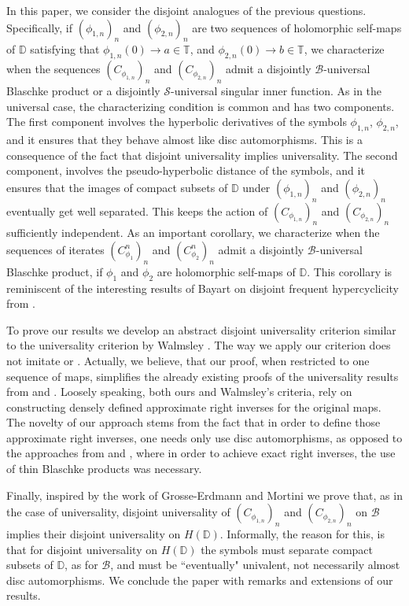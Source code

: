 \documentclass[12pt,a4paper]{amsart}
\theoremstyle{plain}
\theoremstyle{definition}
\theoremstyle{remark}
\theoremstyle{fact}
\begin{document}
In this paper, we consider the disjoint analogues of the previous questions. Specifically, if $(\phi_{1,n})_n$ and $(\phi_{2,n})_n$ are two sequences of holomorphic self-maps of $\mathbb{D}$ satisfying that $\phi_{1,n}(0)\rightarrow a\in \mathbb{T}$, and $\phi_{2,n}(0)\rightarrow b\in \mathbb{T}$, we characterize when the sequences $(C_{\phi_{1,n}})_n$ and $(C_{\phi_{2,n}})_n$ admit a disjointly $\mathcal{B}$-universal Blaschke product or a disjointly $\mathcal{S}$-universal singular inner function. As in the universal case, the characterizing condition is common and has two components. The first component involves the hyperbolic derivatives of the symbols $\phi_{1,n}$, $\phi_{2,n}$, and it ensures that they behave almost like disc automorphisms. This is a consequence of the fact that disjoint universality implies universality. The second component, involves the pseudo-hyperbolic distance of the symbols, and it ensures that the images of compact subsets of $\mathbb{D}$ under $(\phi_{1,n})_n$ and $(\phi_{2,n})_n$ eventually get well separated. This keeps the action of $(C_{\phi_{1,n}})_n$ and $(C_{\phi_{2,n}})_n$ sufficiently independent. As an important corollary, we characterize when the sequences of iterates $(C_{\phi_1}^n)_n$ and $(C_{\phi_2}^n)_n$ admit a disjointly $\mathcal{B}$-universal Blaschke product, if $\phi_1$ and $\phi_2$ are holomorphic self-maps of $\mathbb{D}$. This corollary is reminiscent of the interesting results of Bayart on disjoint frequent hypercyclicity from \cite{ba}.

To prove our results we develop an abstract disjoint universality criterion similar to the universality criterion by Walmsley \cite{Dave}. The way we apply our criterion does not imitate \cite{BGGM09} or \cite{Dave}. Actually, we believe, that our proof, when restricted to one sequence of maps, simplifies the already existing proofs of the universality results from \cite{BGGM09} and \cite{Dave}. Loosely speaking, both ours and Walmsley's criteria, rely on constructing densely defined approximate right inverses for the original maps. The novelty of our approach stems from the fact that in order to define those approximate right inverses, one needs only use disc automorphisms, as opposed to the approaches from \cite{BGGM09} and \cite{Dave}, where in order to achieve exact right inverses, the use of thin Blaschke products was necessary.

Finally, inspired by the work of Grosse-Erdmann and Mortini \cite{GrMo} we prove that, as in the case of universality, disjoint universality of $(C_{\phi_{1,n}})_n$ and $(C_{\phi_{2,n}})_n$ on $\mathcal{B}$ implies their disjoint universality on $H(\mathbb{D})$. Informally, the reason for this, is that for disjoint universality on $H(\mathbb{D})$ the symbols must separate compact subsets of $\mathbb{D}$, as for $\mathcal{B}$, and must be ``eventually" univalent, not necessarily almost disc automorphisms. We conclude the paper with remarks and extensions of our results.
\end{document}
